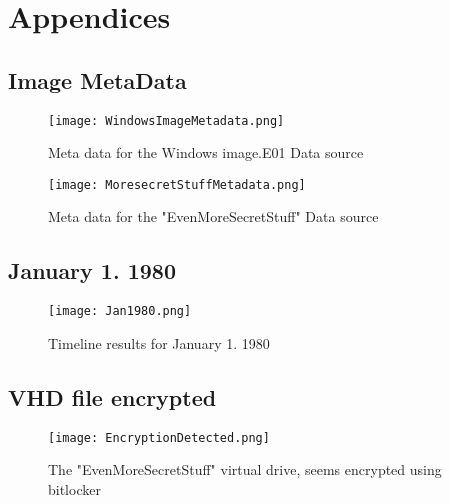 \documentclass[
	letterpaper, %
	10pt, %
	unnumberedsections, %
	twoside, %
]{APAAssignment}
\begin{document}
\chapter{Appendices}
\begin{appendices}

	\section{Image MetaData}\label{app:MetaData}


	\begin{figure}[!h] %
		\centering
		\texttt{[image: WindowsImageMetadata.png]}
		\caption{Meta data for the Windows image.E01 Data source}
		\label{fig:windowsIageMetadata}
	\end{figure}


	\begin{figure}[!h] %
		\centering
		\texttt{[image: MoresecretStuffMetadata.png]}
		\caption{Meta data for the "EvenMoreSecretStuff" Data source}
		\label{fig:evenMoreSecretStuffMetaData}
	\end{figure}


	\clearpage
	\section{January 1. 1980}\label{app:Jan1980}


	\begin{figure}[!h] %
		\centering
		\texttt{[image: Jan1980.png]}
		\caption{Timeline results for January 1. 1980}
		\label{fig:Jan1980}
	\end{figure}

	\clearpage
	\section{VHD file encrypted}\label{app:SecretDriveEncrypted}

	\begin{figure}[!h] %
		\centering
		\texttt{[image: EncryptionDetected.png]}
		\caption{The "EvenMoreSecretStuff" virtual drive, seems encrypted using bitlocker}
		\label{fig:MoreSecretStuffEncrypted}
	\end{figure}



\end{appendices}
\end{document}
